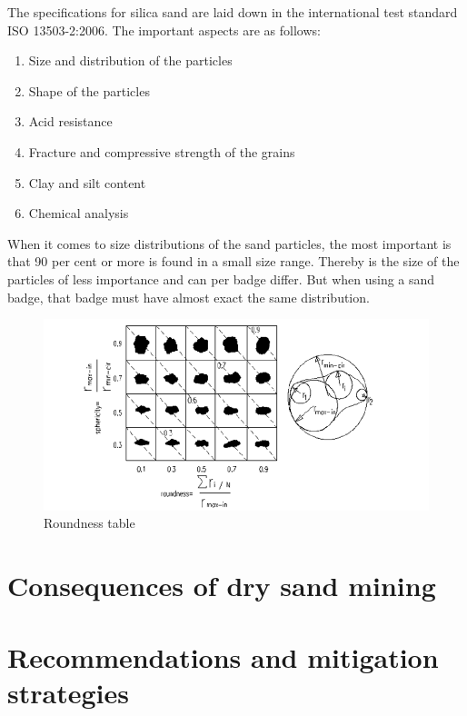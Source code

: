 The specifications for silica sand are laid down in the international test standard ISO 13503-2:2006. The important aspects are as follows:

\begin{enumerate}
    \item  Size and distribution of the particles
    \item Shape of the particles
    \item Acid resistance 
    \item Fracture and compressive strength of the grains
    \item Clay and silt content
    \item Chemical analysis
\end{enumerate}

When it comes to size distributions of the sand particles, the most important is that 90 per cent or more is found in a small size range. Thereby is the size of the particles of less importance and can per badge differ. But when using a sand badge, that badge must have almost exact the same distribution. 


\begin{figure}
    \centering
    \includegraphics[width=0.5\linewidth]{figures//ch9/roundness.png}
    \caption{Roundness table \autocite{particle}}
    \label{fig:placeholder}
\end{figure}

\section{Consequences of dry sand mining}

\section{Recommendations and mitigation strategies}